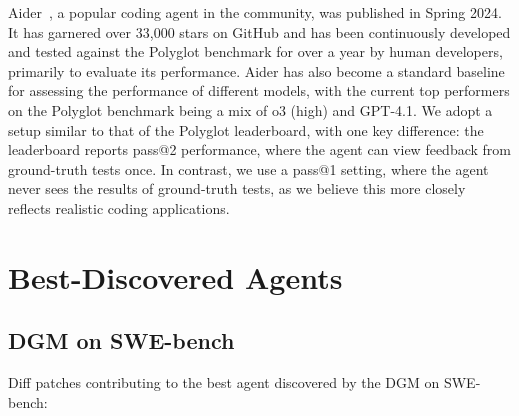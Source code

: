 \documentclass{article}
\begin{document}
Aider~\citep{aider2024}, a popular coding agent in the community, was published in Spring 2024. It has garnered over 33,000 stars on GitHub and has been continuously developed and tested against the Polyglot benchmark for over a year by human developers, primarily to evaluate its performance. Aider has also become a standard baseline for assessing the performance of different models, with the current top performers on the Polyglot benchmark being a mix of o3 (high) and GPT-4.1. We adopt a setup similar to that of the Polyglot leaderboard, with one key difference: the leaderboard reports pass@2 performance, where the agent can view feedback from ground-truth tests once. In contrast, we use a pass@1 setting, where the agent never sees the results of ground-truth tests, as we believe this more closely reflects realistic coding applications.

\section{Best-Discovered Agents}

\subsection{DGM on SWE-bench}
\label{app:best-agent-dgm}
Diff patches contributing to the best agent discovered by the DGM on SWE-bench:
\end{document}
